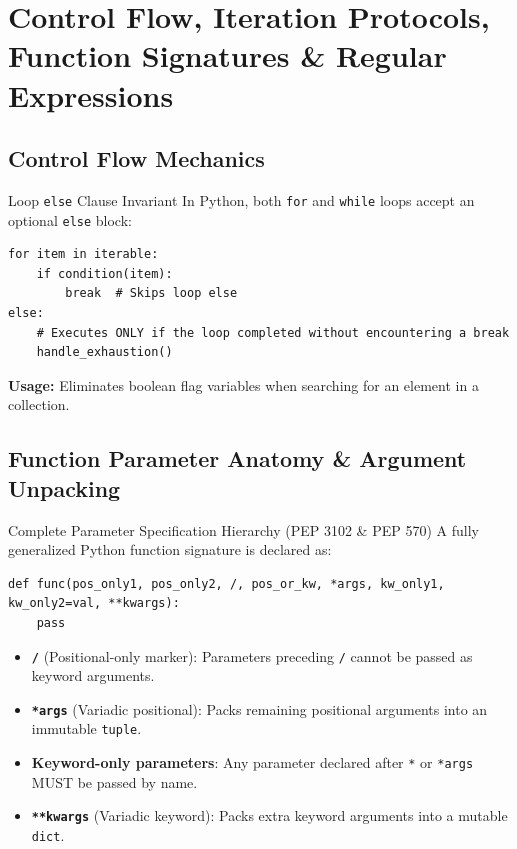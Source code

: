 \chapter{Control Flow, Iteration Protocols, Function Signatures \& Regular Expressions}
\label{chap:functions-control}

\section{Control Flow Mechanics}
\begin{formulabox}{Loop \texttt{else} Clause Invariant}
In Python, both \texttt{for} and \texttt{while} loops accept an optional \texttt{else} block:
\begin{lstlisting}
for item in iterable:
    if condition(item):
        break  # Skips loop else
else:
    # Executes ONLY if the loop completed without encountering a break
    handle_exhaustion()
\end{lstlisting}
\textbf{Usage:} Eliminates boolean flag variables when searching for an element in a collection.
\end{formulabox}

\section{Function Parameter Anatomy \& Argument Unpacking}
\begin{formulabox}{Complete Parameter Specification Hierarchy (PEP 3102 \& PEP 570)}
A fully generalized Python function signature is declared as:
\begin{lstlisting}
def func(pos_only1, pos_only2, /, pos_or_kw, *args, kw_only1, kw_only2=val, **kwargs):
    pass
\end{lstlisting}
\begin{itemize}[leftmargin=1.5em, itemsep=2pt]
    \item \textbf{\texttt{/}} (Positional-only marker): Parameters preceding \texttt{/} cannot be passed as keyword arguments.
    \item \textbf{\texttt{*args}} (Variadic positional): Packs remaining positional arguments into an immutable \texttt{tuple}.
    \item \textbf{Keyword-only parameters}: Any parameter declared after \texttt{*} or \texttt{*args} MUST be passed by name.
    \item \textbf{\texttt{**kwargs}} (Variadic keyword): Packs extra keyword arguments into a mutable \texttt{dict}.
\end{itemize}
\end{formulabox}

